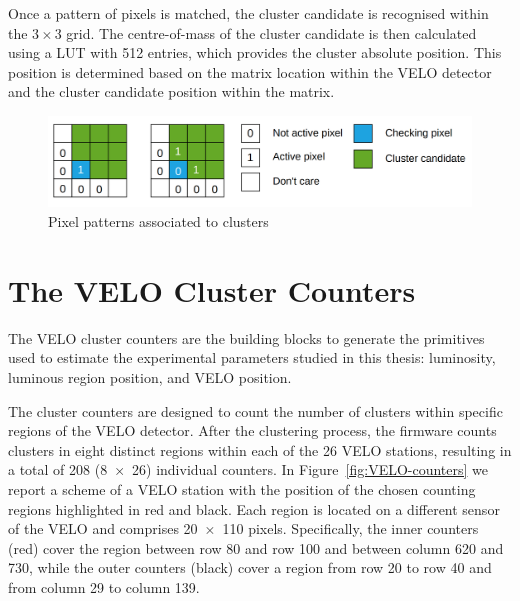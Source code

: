 Once a pattern of pixels is matched, the cluster candidate is recognised within the $3\times3$ grid. The centre-of-mass of the cluster candidate is then calculated using a LUT with 512 entries, which provides the cluster absolute position. This position is determined based on the matrix location within the VELO detector and the cluster candidate position within the matrix.

\begin{figure}
    \centering
    \includegraphics[width=\textwidth]{figures/cluster_recognition.png}
    \caption{Pixel patterns associated to clusters}
    \label{fig:cluster_recognition}
\end{figure}

\section{The VELO Cluster Counters}\label{sec:velo_counters}
The VELO cluster counters are the building blocks to generate the primitives used to estimate the experimental parameters studied in this thesis: luminosity, luminous region position, and VELO position. 

The cluster counters are designed to count the number of clusters within specific regions of the VELO detector. After the clustering process, the firmware counts clusters in eight distinct regions within each of the 26 VELO stations, resulting in a total of 208 (8~×~26) individual counters. In Figure~\ref{fig:VELO-counters} we report a scheme of a VELO station with the position of the chosen counting regions highlighted in red and black. Each region is located on a different sensor of the VELO and comprises 20~×~110 pixels. Specifically, the inner counters (red) cover the region between row 80 and row 100 and between column 620 and 730, while the outer counters (black) cover a region from row 20 to row 40 and from column 29 to column 139. 


